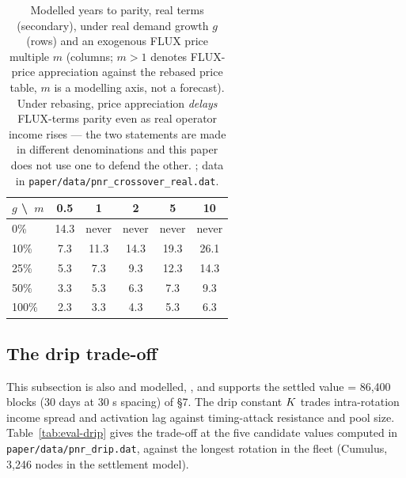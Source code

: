\begin{table}[H]
\centering
\small
\begin{tabular}{lccccc}
\toprule
$g$ \textbackslash\ $m$ & 0.5 & 1 & 2 & 5 & 10 \\
\midrule
0\% & 14.3 & never & never & never & never \\
10\% & 7.3 & 11.3 & 14.3 & 19.3 & 26.1 \\
25\% & 5.3 & 7.3 & 9.3 & 12.3 & 14.3 \\
50\% & 3.3 & 5.3 & 6.3 & 7.3 & 9.3 \\
100\% & 2.3 & 3.3 & 4.3 & 5.3 & 6.3 \\
\bottomrule
\end{tabular}
\caption{Modelled years to \PNR parity, real terms (secondary), under real demand growth $g$
(rows) and an exogenous FLUX price multiple $m$ (columns; $m > 1$ denotes FLUX-price appreciation
against the rebased price table, $m$ is a modelling axis, not a forecast). Under rebasing, price
appreciation \emph{delays} FLUX-terms parity even as real operator income rises — the two
statements are made in different denominations and this paper does not use one to defend the other.
; data in
\texttt{paper/\allowbreak{}data/\allowbreak{}pnr\_crossover\_real.\allowbreak{}dat}.}
\label{tab:eval-pnr-real}
\end{table}

\subsection{The drip trade-off}
\label{sec:eval-drip}

This subsection is also \planned and modelled, ,
and supports the settled value \drip = 86,400 blocks (30 days at 30 s spacing) of \S7. The
drip constant $K$ trades intra-rotation income spread and activation lag against timing-attack
resistance and pool size. Table~\ref{tab:eval-drip} gives the trade-off at the five candidate values
computed in \texttt{paper/\allowbreak{}data/\allowbreak{}pnr\_drip.\allowbreak{}dat}, against the longest rotation in the fleet (Cumulus,
3,246 nodes in the settlement model).

